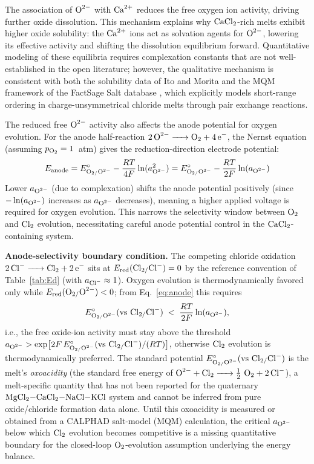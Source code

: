 \documentclass[sn-mathphys,Numbered]{sn-jnl}
\begin{document}
The association of $\ce{O^{2-}}$ with $\ce{Ca^{2+}}$ reduces the free oxygen ion activity, driving further oxide dissolution. This mechanism explains why $\ce{CaCl2}$-rich melts exhibit higher oxide solubility: the $\ce{Ca^{2+}}$ ions act as solvation agents for $\ce{O^{2-}}$, lowering its effective activity and shifting the dissolution equilibrium forward. Quantitative modeling of these equilibria requires complexation constants that are not well-established in the open literature; however, the qualitative mechanism is consistent with both the solubility data of Ito and Morita \cite{morita2004} and the MQM framework of the FactSage Salt database \cite{pelton2000mqm}, which explicitly models short-range ordering in charge-unsymmetrical chloride melts through pair exchange reactions.

The reduced free $\ce{O^{2-}}$ activity also affects the anode potential for oxygen evolution. For the anode half-reaction $\ce{2O^{2-} -> O2 + 4e^-}$, the Nernst equation (assuming $p_{\ce{O2}} = 1$~atm) gives the reduction-direction electrode potential:
\begin{equation}
\label{eq:anode}
E_{\mathrm{anode}} = E^{\circ}_{\ce{O2/O^{2-}}} - \frac{RT}{4F}\ln(a_{\ce{O^{2-}}}^2) = E^{\circ}_{\ce{O2/O^{2-}}} - \frac{RT}{2F}\ln(a_{\ce{O^{2-}}})
\end{equation}
Lower $a_{\ce{O^{2-}}}$ (due to complexation) shifts the anode potential positively (since $-\ln(a_{\ce{O^{2-}}})$ increases as $a_{\ce{O^{2-}}}$ decreases), meaning a higher applied voltage is required for oxygen evolution. This narrows the selectivity window between $\ce{O2}$ and $\ce{Cl2}$ evolution, necessitating careful anode potential control in the $\ce{CaCl2}$-containing system.

\textbf{Anode-selectivity boundary condition.} The competing chloride oxidation $\ce{2Cl^- -> Cl2 + 2e^-}$ sits at $E_{\mathrm{red}}(\ce{Cl2/Cl^-}) = 0$ by the reference convention of Table~\ref{tab:Ed} (with $a_{\ce{Cl^-}} \approx 1$). Oxygen evolution is thermodynamically favored only while $E_{\mathrm{red}}(\ce{O2/O^{2-}}) < 0$; from Eq.~\ref{eq:anode} this requires
\begin{equation}
E^{\circ}_{\ce{O2/O^{2-}}}(\mathrm{vs}~\ce{Cl2/Cl^-}) \;<\; \frac{RT}{2F}\ln(a_{\ce{O^{2-}}}),
\end{equation}
i.e., the free oxide-ion activity must stay above the threshold $a_{\ce{O^{2-}}} > \exp\!\big[2F\,E^{\circ}_{\ce{O2/O^{2-}}}(\mathrm{vs}~\ce{Cl2/Cl^-})/(RT)\big]$, otherwise $\ce{Cl2}$ evolution is thermodynamically preferred. The standard potential $E^{\circ}_{\ce{O2/O^{2-}}}(\mathrm{vs}~\ce{Cl2/Cl^-})$ is the melt's \emph{oxoacidity} (the standard free energy of $\ce{O^{2-} + Cl2 -> 1/2\,O2 + 2Cl^-}$), a melt-specific quantity that has not been reported for the quaternary $\ce{MgCl2-CaCl2-NaCl-KCl}$ system and cannot be inferred from pure oxide/chloride formation data alone. Until this oxoacidity is measured or obtained from a CALPHAD salt-model (MQM) calculation, the critical $a_{\ce{O^{2-}}}$ below which $\ce{Cl2}$ evolution becomes competitive is a missing quantitative boundary for the closed-loop $\ce{O2}$-evolution assumption underlying the energy balance.
\end{document}
